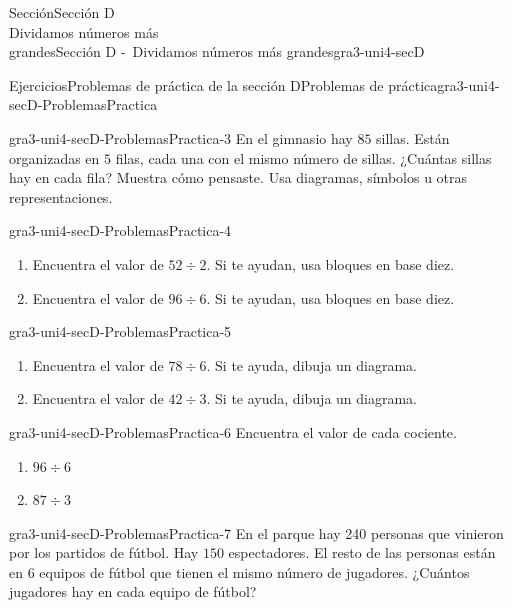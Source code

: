 \begin{sectionptx}{Sección}{{\Large Sección D\\}Dividamos números más\\grandes}{}{Sección D -~Dividamos números más grandes}{}{}{gra3-uni4-secD}
%
\begin{exercises-subsection}{Ejercicios}{Problemas de práctica de la sección D}{}{Problemas de práctica}{}{}{gra3-uni4-secD-ProblemasPractica}
\begin{divisionexercise}{1}{}{}{gra3-uni4-secD-ProblemasPractica-3}%
En el gimnasio hay \(85\) sillas. Están organizadas en \(5\) filas, cada una con el mismo número de sillas. ¿Cuántas sillas hay en cada fila? Muestra cómo pensaste. Usa diagramas, símbolos u otras representaciones.%
\end{divisionexercise}%
\begin{divisionexercise}{2}{}{}{gra3-uni4-secD-ProblemasPractica-4}%
%
\begin{enumerate}[label={(\alph*)}]
\item{}Encuentra el valor de \(52 \div 2\). Si te ayudan, usa bloques en base diez.%
\item{}Encuentra el valor de \(96 \div 6\). Si te ayudan, usa bloques en base diez.%
\end{enumerate}
\end{divisionexercise}%
\begin{divisionexercise}{3}{}{}{gra3-uni4-secD-ProblemasPractica-5}%
%
\begin{enumerate}[label={(\alph*)}]
\item{}Encuentra el valor de \(78 \div 6\). Si te ayuda, dibuja un diagrama.%
\item{}Encuentra el valor de \(42 \div 3\). Si te ayuda, dibuja un diagrama.%
\end{enumerate}
\end{divisionexercise}%
\begin{divisionexercise}{4}{}{}{gra3-uni4-secD-ProblemasPractica-6}%
Encuentra el valor de cada cociente.%
%
\begin{enumerate}[label={(\alph*)}]
\item{}\(\displaystyle 96 \div 6\)%
\item{}\(\displaystyle 87 \div 3\)%
\end{enumerate}
\end{divisionexercise}%
\begin{divisionexercise}{5}{}{}{gra3-uni4-secD-ProblemasPractica-7}%
En el parque hay 240 personas que vinieron por los partidos de fútbol. Hay \(150\) espectadores. El resto de las personas están en \(6\) equipos de fútbol que tienen el mismo número de jugadores. ¿Cuántos jugadores hay en cada equipo de fútbol?%
%
\begin{enumerate}[label={(\alph*)}]

\end{enumerate}
\end{divisionexercise}
\end{exercises-subsection}
\end{sectionptx}
